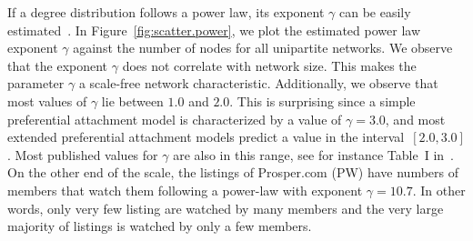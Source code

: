 \documentclass[11pt,a4paper]{book}
\begin{document}
If a degree distribution follows a power law, its exponent $\gamma$ can
be easily estimated~\cite{b462}.  In Figure~\ref{fig:scatter.power}, we
plot the estimated 
power law exponent $\gamma$ against the number of nodes for all unipartite
networks.  
We observe that the exponent $\gamma$ does not correlate with network
size. 
This makes the parameter $\gamma$ a scale-free network characteristic. 
Additionally, we observe that most values of $\gamma$ lie between $1.0$
and $2.0$.  This is surprising since a simple preferential attachment
model is characterized by a value of $\gamma=3.0$, and most extended
preferential attachment models predict a value in the interval~$[2.0,3.0]$. 
Most published values for $\gamma$ are also in this range, see for
instance Table~I in~\cite{b408}. 
On the other end of the scale, the listings of Prosper.com (\textsf{PW}) have numbers of
members that watch them following a power-law with exponent
$\gamma=10.7$.  In other words, only very few listing are watched by
many members and the very large majority of listings is watched by only a
few members. 
\end{document}
